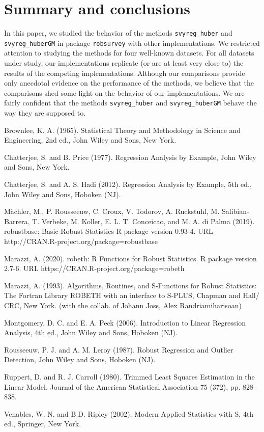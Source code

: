 \documentclass[a4paper]{scrartcl}
\begin{document}
\section{Summary and conclusions}\label{sec:summary}
In this paper, we studied the behavior of the methods \texttt{svyreg\_huber}  and \texttt{svyreg\_huberGM} in package \texttt{robsurvey} with other implementations. We restricted attention to studying the methods for four well-known datasets. For all datasets under study, our implementations replicate (or are at least very close to) the results of the competing implementations. Although our comparisons provide only anecdotal evidence on the performance of the methods, we believe that the comparisons shed some light on the behavior of our implementations. We are fairly confident that the methods \texttt{svyreg\_huber}  and \texttt{svyreg\_huberGM} behave the way they are supposed to. 


\begin{thebibliography}{9}

Brownlee, K. A. (1965). Statistical Theory and Methodology in Science and 
   Engineering, 2nd ed., John Wiley and Sons, New York.

Chatterjee, S. and B. Price (1977). Regression Analysis by Example, John Wiley
   and Sons, New York. 

Chatterjee, S. and A. S. Hadi (2012). Regression Analysis by Example, 5th ed., 
   John Wiley and Sons, Hoboken (NJ). 

M{\"a}chler, M., P. Rousseeuw, C. Croux, V. Todorov, A. Ruckstuhl, M. 
   Salibian-Barrera, T. Verbeke, M. Koller, E. L. T. Conceicao, and 
   M. A. di Palma (2019). robustbase: Basic 
   Robust Statistics R package version 0.93-4. 
   URL http://CRAN.R-project.org/package=robustbase

Marazzi, A. (2020). robeth: R Functions for Robust Statistics. 
   R package version 2.7-6. 
   URL https://CRAN.R-project.org/package=robeth

Marazzi, A. (1993). Algorithms, Routines, and S-Functions for Robust Statistics: 
   The Fortran Library ROBETH with an interface to S-PLUS, 
   Chapman and Hall/ CRC, New York. (with the collab. of Johann Joss, Alex 
   Randriamiharisoan)

Montgomery, D. C. and E. A. Peck (2006). Introduction to Linear Regression
   Analysis, 4th ed., John Wiley and Sons, Hoboken (NJ).

Rousseeuw, P. J. and A. M. Leroy (1987). Robust Regression and Outlier 
   Detection, John Wiley and Sons, Hoboken (NJ). 

Ruppert, D. and R. J. Carroll (1980). Trimmed Least Squares Estimation in the 
   Linear Model. Journal of the American Statistical Association 75 (372), 
   pp. 828--838.

Venables, W. N. and B.D. Ripley (2002). Modern Applied Statistics with S, 
   4th ed., Springer, New York. 
\end{thebibliography}
\end{document}
